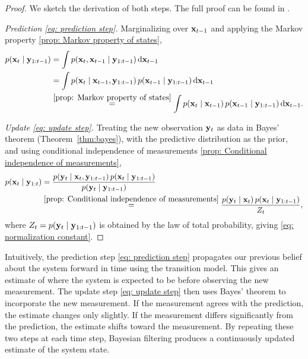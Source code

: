 \begin{proof}
We sketch the derivation of both steps. The full proof can be found in
\cite[p.~55 and 56]{sarkka:bayesian_filtering}.

\noindent\textit{Prediction \eqref{eq: prediction step}.}
Marginalizing over $\mathbf{x}_{t-1}$ and applying the Markov property
\eqref{prop: Markov property of states},
\begin{align*}
  p(\mathbf{x}_{t} \mid \mathbf{y}_{1:t-1})
  &= \int p(\mathbf{x}_{t}, \mathbf{x}_{t-1} \mid \mathbf{y}_{1:t-1})\,
         \mathrm{d}\mathbf{x}_{t-1} \\
  &= \int p(\mathbf{x}_{t} \mid \mathbf{x}_{t-1}, \mathbf{y}_{1:t-1})\,
         p(\mathbf{x}_{t-1} \mid \mathbf{y}_{1:t-1})\,
         \mathrm{d}\mathbf{x}_{t-1} \\
  &\overset{\eqref{prop: Markov property of states}}{=}
    \int p(\mathbf{x}_{t} \mid \mathbf{x}_{t-1})\,
         p(\mathbf{x}_{t-1} \mid \mathbf{y}_{1:t-1})\,
         \mathrm{d}\mathbf{x}_{t-1}.
\end{align*}

\noindent\textit{Update \eqref{eq: update step}.}
Treating the new observation $\mathbf{y}_{t}$ as data in Bayes' theorem
(Theorem~\ref{thm:bayes}), with the predictive distribution as the prior, and
using conditional independence of measurements \eqref{prop: Conditional independence of measurements},
\begin{align*}
  p(\mathbf{x}_{t} \mid \mathbf{y}_{1:t})
  &= \frac{p(\mathbf{y}_{t} \mid \mathbf{x}_{t}, \mathbf{y}_{1:t-1})\,
           p(\mathbf{x}_{t} \mid \mathbf{y}_{1:t-1})}
          {p(\mathbf{y}_{t} \mid \mathbf{y}_{1:t-1})} \\
  &\overset{\eqref{prop: Conditional independence of measurements}}{=}
    \frac{p(\mathbf{y}_{t} \mid \mathbf{x}_{t})\,
          p(\mathbf{x}_{t} \mid \mathbf{y}_{1:t-1})}{Z_{t}},
\end{align*}
where $Z_{t} = p(\mathbf{y}_{t} \mid \mathbf{y}_{1:t-1})$ is obtained by the law of
total probability, giving \eqref{eq: normalization constant}.
\end{proof}

Intuitively, the prediction step \eqref{eq: prediction step} propagates our previous belief about the system forward in time using the transition model. This gives an estimate of where the system is expected to be before observing the new measurement. 
The update step \eqref{eq: update step} then uses Bayes' theorem to incorporate the new measurement. If the measurement agrees with the prediction, the estimate changes only slightly. If the measurement differs significantly from the prediction, the estimate shifts toward the measurement. By repeating these two steps at each time step, Bayesian filtering produces a continuously updated estimate of the system state.

